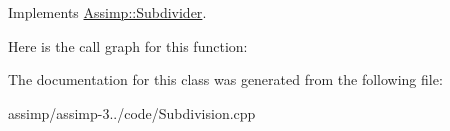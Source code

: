 Implements \hyperlink{class_assimp_1_1_subdivider_a26a77d10069201eb198942c8b7459f0f}{Assimp\+::\+Subdivider}.



Here is the call graph for this function\+:




The documentation for this class was generated from the following file\+:\begin{DoxyCompactItemize}
\item 
assimp/assimp-\/3../code/Subdivision.\+cpp\end{DoxyCompactItemize}
